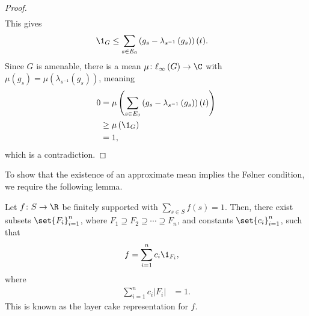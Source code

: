 \documentclass[10pt]{mypackage2}
\begin{document}
\begin{proof}
\begin{align*}
  \end{align*}
  This gives
  \begin{align*}
    \1_{G} &\leq \sum_{s\in E_0}\left( g_s - \lambda_{s^{-1}}\left(g_s\right) \right)(t).
  \end{align*}
  Since $G$ is amenable, there is a mean $\mu\colon \ell_{\infty}\left(G\right)\rightarrow \C$ with $\mu\left(g_s\right) = \mu\left(\lambda_{s^{-1}}\left(g_s\right)\right)$, meaning
  \begin{align*}
    0 &= \mu\left(\sum_{s\in E_0}\left(g_s - \lambda_{s^{-1}}\left(g_s\right)\right)\left(t\right)\right)\\
      &\geq \mu\left(\1_{G}\right)\\
      &= 1,
  \end{align*}
  which is a contradiction.
\end{proof}
To show that the existence of an approximate mean implies the Følner condition, we require the following lemma.
\begin{lemma}\label{lemma:layer_cake_representation}
  Let $f\colon S\rightarrow \R$ be finitely supported with $\sum_{s\in S}f(s) = 1$. Then, there exist subsets $\set{F_i}_{i=1}^{n}$, where $F_1\supseteq F_2\supseteq \cdots \supseteq F_n$, and constants $\set{c_i}_{i=1}^{n}$, such that
  \begin{align*}
    f &= \sum_{i=1}^{n}c_i\1_{F_i},
  \end{align*}
  where
  \begin{align*}
    \sum_{i=1}^{n}c_i\left\vert F_i \right\vert &= 1.
  \end{align*}
  This is known as the layer cake representation for $f$.
\end{lemma}
\end{document}
